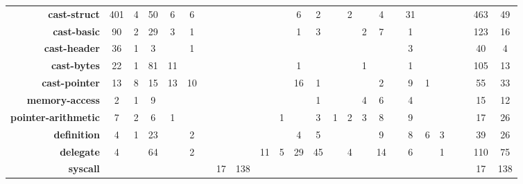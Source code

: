 \begin{table*}[htp!]
\begin{adjustbox}{max width=\textwidth}
\begin{tabular}{r|cc|cc|cc|cc|cc|cc|cc|cc|cc|cc|cc|cc}
        \textbf{cast-struct} &  401 &    4 &   50 &    6 &    6 &      &       &      &        &      &    6 &    2 &      &    2 &        &    4 &       &   31 &         &      &        &      &   463 &   49 \\
\rowcolor{verylightgray}
         \textbf{cast-basic} &   90 &    2 &   29 &    3 &    1 &      &       &      &        &      &    1 &    3 &      &      &      2 &    7 &       &    1 &         &      &        &      &   123 &   16 \\
                    \textbf{cast-header} &   36 &    1 &    3 &      &    1 &      &       &      &        &      &      &      &      &      &        &      &       &    3 &         &      &        &      &    40 &    4 \\
\rowcolor{verylightgray}
                    \textbf{cast-bytes} &   22 &    1 &   81 &   11 &      &      &       &      &        &      &    1 &      &      &      &      1 &      &       &    1 &         &      &        &      &   105 &   13 \\
                    \textbf{cast-pointer} &   13 &    8 &   15 &   13 &   10 &      &       &      &        &      &   16 &    1 &      &      &        &    2 &       &    9 &       1 &      &        &      &    55 &   33 \\
\rowcolor{verylightgray}
      \textbf{memory-access} &    2 &    1 &    9 &      &      &      &       &      &        &      &      &    1 &      &      &      4 &    6 &       &    4 &         &      &        &      &    15 &   12 \\
 \textbf{pointer-arithmetic} &    7 &    2 &    6 &    1 &      &      &       &      &        &    1 &      &    3 &    1 &    2 &      3 &    8 &       &    9 &         &      &        &      &    17 &   26 \\
\rowcolor{verylightgray}
         \textbf{definition} &    4 &    1 &   23 &      &    2 &      &       &      &        &      &    4 &    5 &      &      &        &    9 &       &    8 &       6 &    3 &        &      &    39 &   26 \\
           \textbf{delegate} &    4 &      &   64 &      &    2 &      &       &      &     11 &    5 &   29 &   45 &      &    4 &        &   14 &       &    6 &         &    1 &        &      &   110 &   75 \\
\rowcolor{verylightgray}
            \textbf{syscall} &      &      &      &      &      &      &    17 &  138 &        &      &      &      &      &      &        &      &       &      &         &      &        &      &    17 &  138 \\

\end{tabular}
\end{adjustbox}
\end{table*}
